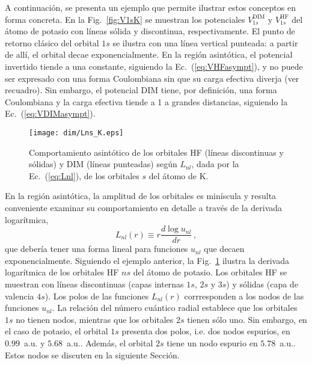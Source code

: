 A continuación, se presenta un ejemplo que permite ilustrar estos 
conceptos en forma concreta. En la Fig.~\ref{fig:V1sK} se muestran los 
potenciales $V_{1s}^{\mathrm{DIM}}$ y $V_{1s}^{\mathrm{HF}}$ del átomo 
de potasio con líneas sólida y discontinua, respectivamente. El punto de 
retorno clásico del orbital $1s$ se ilustra con una línea vertical 
punteada: a partir de allí, el orbital decae exponencialmente. En la 
región asintótica, el potencial invertido tiende a una constante, 
siguiendo la Ec.~(\ref{eq:VHFasympt}), y no puede ser expresado con una 
forma Coulombiana sin que su carga efectiva diverja (ver recuadro). Sin 
embargo, el potencial DIM tiene, por definición, una forma Coulombiana y 
la carga efectiva tiende a 1 a grandes distancias, siguiendo la 
Ec.~(\ref{eq:VDIMasympt}).

\begin{figure}[t]
\centering
\texttt{[image: dim/Lns\_K.eps]} 
\caption[Comportamiento asintótico de los orbitales HF.]
{Comportamiento asintótico de los orbitales HF (líneas discontinuas y 
sólidas) y DIM (líneas punteadas) según $L_{nl}$, dada por la 
Ec.~(\ref{eq:Lnl}), de los orbitales $s$ del átomo de K.}
\label{fig:LnsK}
\end{figure}

En la región asintótica, la amplitud de los orbitales es miníscula y 
resulta conveniente examinar su comportamiento en detalle a través de la 
derivada logarítmica, 
\begin{equation}
L_{nl}(r) \equiv r \frac{d \log{u_{nl}}}{d r}\,,
\label{eq:Lnl}
\end{equation}
que debería tener una forma lineal para funciones $u_{nl}$ que decaen 
exponencialmente. Siguiendo el ejemplo anterior, la Fig.~\ref{fig:LnsK} 
ilustra la derivada logarítmica de los orbitales HF $ns$ del átomo de 
potasio. Los orbitales HF se muestran con líneas discontinuas (capas 
internas $1s$, $2s$ y $3s$) y sólidas (capa de valencia $4s$). 
Los polos de las funciones $L_{nl}(r)$ corrresponden a los nodos de las 
funciones $u_{nl}$. La relación del número cuántico radial establece que 
los orbitales $1s$ no tienen nodos, mientras que los orbitales $2s$ 
tienen sólo uno. Sin embargo, en el caso de potasio, el orbital $1s$ 
presenta dos polos, i.e. dos nodos espurios, en $0.99$~a.u. y 
$5.68$~a.u.. Además, el orbital $2s$ tiene un nodo espurio en 
$5.78$~a.u.. Estos nodos se discuten en la siguiente Sección.


